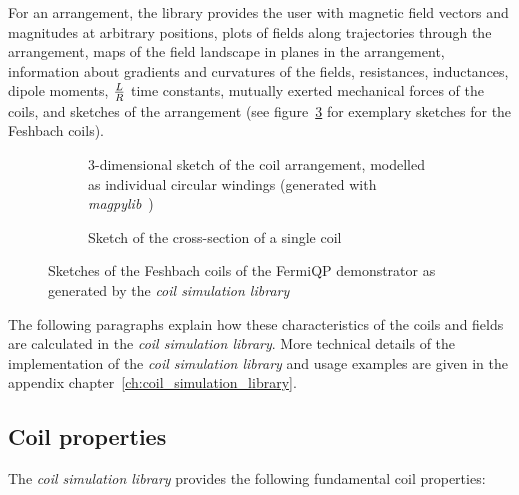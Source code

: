 For an arrangement, the library provides the user with magnetic field vectors and magnitudes at arbitrary positions, plots of fields along trajectories through the arrangement, maps of the field landscape in planes in the arrangement, information about gradients and curvatures of the fields, resistances, inductances, dipole moments, $L\over R$ time constants, mutually exerted mechanical forces of the coils, and sketches of the arrangement (see figure~\ref{fig:csl_sketches} for exemplary sketches for the Feshbach coils).

\begin{figure}
    \centering
    \begin{subfigure}[t]{0.47\textwidth}
        \centering
        \resizebox{\textwidth}{!}{
            \begin{pgfpicture}
                \pgftext{}
            \end{pgfpicture}
        }
        \caption{3-dimensional sketch of the coil arrangement, modelled as individual circular windings (generated with \textit{magpylib}~\cite{noauthor_magpylibmagpylib_nodate})}
        \label{fig:csl_sketches_3d}
    \end{subfigure}
    \hspace{0.04\textwidth}
    \begin{subfigure}[t]{0.47\textwidth}
        \centering
        \resizebox{\textwidth}{!}{
            \begin{pgfpicture}
                \pgftext{}
            \end{pgfpicture}
        }
        \caption{Sketch of the cross-section of a single coil}
        \label{fig:csl_sketches_cross_section}
    \end{subfigure}
    \caption{Sketches of the Feshbach coils of the FermiQP demonstrator as generated by the \textit{coil simulation library}}
    \label{fig:csl_sketches}
\end{figure}

The following paragraphs explain how these characteristics of the coils and fields are calculated in the \textit{coil simulation library}. More technical details of the implementation of the \textit{coil simulation library} and usage examples are given in the appendix chapter~\ref{ch:coil_simulation_library}. 

\subsection*{Coil properties}
The \textit{coil simulation library} provides the following fundamental coil properties:
